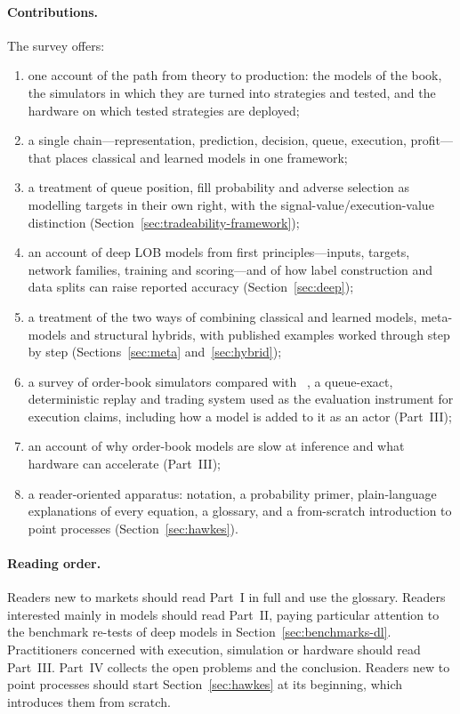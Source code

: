 \paragraph{Contributions.} The survey offers:
\begin{enumerate}[leftmargin=1.8em,itemsep=1pt]
\item one account of the path from theory to production: the models of the book, the simulators in which they are
  turned into strategies and tested, and the hardware on which tested strategies are deployed;
\item a single chain---representation, prediction, decision, queue, execution, profit---that places
  classical and learned models in one framework;
\item a treatment of queue position, fill probability and adverse selection as modelling targets in
  their own right, with the signal-value/execution-value distinction (Section~\ref{sec:tradeability-framework});
\item an account of deep LOB models from first principles---inputs, targets, network families, training and
  scoring---and of how label construction and data splits can raise reported
  accuracy (Section~\ref{sec:deep});
\item a treatment of the two ways of combining classical and learned models, meta-models and structural hybrids,
  with published examples worked through step by step (Sections~\ref{sec:meta} and~\ref{sec:hybrid});
\item a survey of order-book simulators compared with \kasparhft{}~\citep{kaspar_hft}, a queue-exact, deterministic replay
  and trading system used as the evaluation instrument for execution claims, including how a model is added to it as
  an actor (Part~III);
\item an account of why order-book models are slow at inference and what hardware can accelerate
  (Part~III);
\item a reader-oriented apparatus: notation, a probability primer, plain-language explanations of every
  equation, a glossary, and a from-scratch introduction to point processes (Section~\ref{sec:hawkes}).
\end{enumerate}

\paragraph{Reading order.} Readers new to markets should read Part~I in full and use the
glossary. Readers interested mainly in models should read Part~II, paying particular attention to the benchmark re-tests of
deep models in Section~\ref{sec:benchmarks-dl}.
Practitioners concerned with execution, simulation or hardware should read Part~III. Part~IV collects the open
problems and the conclusion. Readers new to point processes
should start Section~\ref{sec:hawkes} at its beginning, which introduces them from scratch.

